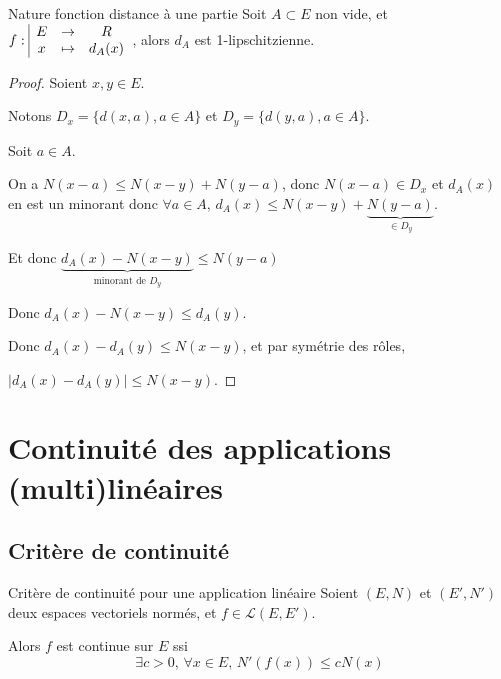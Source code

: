 \begin{proposition}{Nature fonction distance à une partie}{}
    Soit $A \subset E$ non vide, et $f: \space \begin{array}{|ccc} \displaystyle E & \to & \displaystyle R \\ \displaystyle x & \mapsto & \displaystyle d_A(x) \end{array}$,
    alors $d_A$ est 1-lipschitzienne. 
\end{proposition}

\begin{proof}
    Soient $x, y \in E$. 

    Notons $D_x = \{d(x, a), a \in A\}$ et $D_y = \{d(y, a), a \in A\}$.

    Soit $a \in A$. 

    On a $N(x - a) \leqslant N(x - y) + N(y - a)$, donc $N(x - a) \in D_x$ et 
    $d_A(x)$ en est un minorant donc $\forall a \in A, \, d_A(x) \leqslant N(x - y) + \underbrace{N(y - a)}_{\in D_y}$.

    Et donc $\underbrace{d_A(x) - N(x - y)}_{\text{minorant de } D_y} \leqslant N(y - a)$

    Donc $d_A(x) - N(x - y) \leqslant d_A(y)$.

    Donc $d_A(x) - d_A(y) \leqslant N(x - y)$, et par symétrie des rôles, 

    $|d_A(x) - d_A(y)| \leqslant N(x - y)$.
\end{proof}

\section{Continuité des applications (multi)linéaires}
\subsection{Critère de continuité}

\begin{theoreme}{Critère de continuité pour une application linéaire}{}
    Soient $(E, N)$ et $(E', N')$ deux espaces vectoriels normés, et $ f \in \mathscr L(E, E')$.

    Alors $f$ est continue sur $E$ ssi 
    \[\exists c > 0, \, \forall x \in E, \, N'(f(x)) \leqslant c N(x)\]
\end{theoreme}


